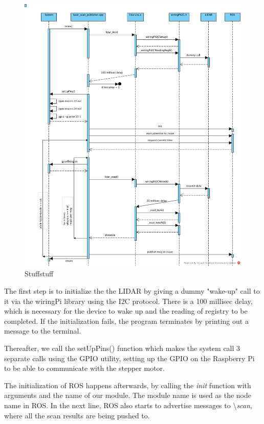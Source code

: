 \begin{figure}[H]
	\centering
	\includegraphics[scale=.6]{images/laser-module.png}
	\caption{Stuffstuff}
	\label{fig:lasermodule}
\end{figure}

The first step is to initialize the the LIDAR by giving a dummy "wake-up" call to it via the wiringPi library using the I2C protocol. There is a 100 millisec delay, which is necessary for the device to wake up and the reading of registry to be completed. If the initialization fails, the program terminates by printing out a message to the terminal.

Thereafter, we call the setUpPins() function which makes the system call 3 separate calls using the GPIO utility, setting up the GPIO on the Raspberry Pi to be able to communicate with the stepper motor.

The initialization of ROS happens afterwards, by calling the \textit{init} function with arguments and the name of our module. The module name is used as the node name in ROS. In the next line, ROS also starts to advertise messages to \textbackslash\textit{scan}, where all the scan results are being pushed to.

